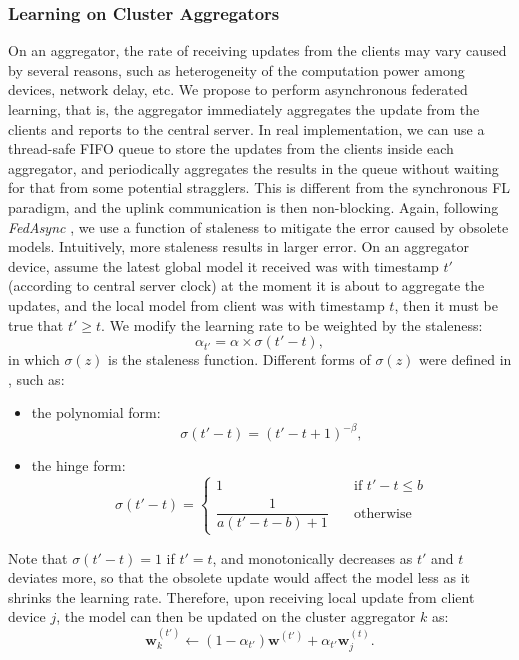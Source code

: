 \documentclass[10pt,twocolumn,letterpaper]{article}
\theoremstyle{definition}
\begin{document}
\subsubsection{Learning on Cluster Aggregators}
On an aggregator, the rate of receiving updates from the clients may vary caused by several reasons, such as heterogeneity of the computation power among devices, network delay, etc. We propose to perform asynchronous federated learning, that is, the aggregator immediately aggregates the update from the clients and reports to the central server. In real implementation, we can use a thread-safe FIFO queue to store the updates from the clients inside each aggregator, and periodically aggregates the results in the queue without waiting for that from some potential stragglers. This is different from the synchronous FL paradigm, and the uplink communication is then non-blocking. Again, following \textit{FedAsync} \cite{xie2019asynchronous}, we use a function of staleness to mitigate the error caused by obsolete models. Intuitively, more staleness results in larger error. On an aggregator device, assume the latest global model it received was with timestamp $t'$ (according to central server clock) at the moment it is about to aggregate the updates,
and the local model from client was with timestamp $t$, then it must be true that $t' \ge t$. We modify the learning rate to be weighted by the staleness:
\[ \alpha_{t'} = \alpha \times \sigma(t'-t), \]
in which $\sigma(z)$ is the staleness function. Different forms of $\sigma(z)$ were defined in \cite{xie2019asynchronous}, such as:
\begin{itemize}
    \item the polynomial form: \[ \sigma (t'-t) = (t'-t+1)^{-\beta} , \]
    \item the hinge form: \[ \sigma (t'-t) = \begin{cases}
    1      & \quad \text{if } t'-t \le b \\
    \dfrac{1}{a(t'-t-b)+1}  & \quad \text{otherwise}
  \end{cases} \]
\end{itemize}
Note that $\sigma(t'-t)=1$ if $t'=t$, and monotonically decreases as $t'$ and $t$ deviates more, so that the obsolete update would affect the model less as it shrinks the learning rate. 
Therefore, upon receiving local update from client device $j$, the model can then be updated on the cluster aggregator $k$ as:
\[ \mathbf{w}_k^{(t')} \leftarrow (1-\alpha_{t'}) \mathbf{w}^{(t')} + \alpha_{t'} \mathbf{w}^{(t)}_{j}. \]
\end{document}
